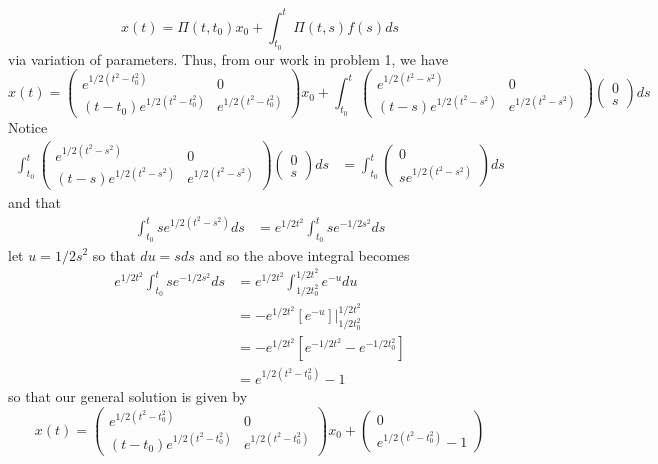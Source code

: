 \documentclass{article}
\begin{document}
\begin{itemize}
\[x(t) = \Pi(t,t_0)x_0 + \int_{t_0}^t\Pi(t,s)f(s)ds\]
via variation of parameters. Thus, from our work in problem 1, we have
\[x(t) = 
\begin{pmatrix}
    e^{1/2(t^2 - t_0^2)} & 0\\
    (t - t_0)e^{1/2(t^2 - t_0^2)} & e^{1/2(t^2 - t_0^2)}
\end{pmatrix}x_0 + \int_{t_0}^t \begin{pmatrix}
        e^{1/2(t^2 - s^2)} & 0\\
        (t - s)e^{1/2(t^2 - s^2)} & e^{1/2(t^2 - s^2)}
\end{pmatrix}\begin{pmatrix}
    0\\
    s
\end{pmatrix}ds\]
Notice
\begin{align*}
    \int_{t_0}^t \begin{pmatrix}
        e^{1/2(t^2 - s^2)} & 0\\
        (t - s)e^{1/2(t^2 - s^2)} & e^{1/2(t^2 - s^2)}
    \end{pmatrix}\begin{pmatrix}
        0\\
        s
    \end{pmatrix}ds &= \int_{t_0}^t \begin{pmatrix}
        0\\
        se^{1/2(t^2 - s^2)}
    \end{pmatrix}ds
\end{align*}
and that
\begin{align*}
    \int_{t_0}^t se^{1/2(t^2-s^2)}ds &= e^{1/2t^2} \int_{t_0}^t se^{-1/2s^2}ds
\end{align*}
let $u = 1/2s^2$ so that $du = sds$ and so the above integral becomes
\begin{align*}
    e^{1/2t^2} \int_{t_0}^t se^{-1/2s^2}ds &= e^{1/2t^2}\int_{1/2t_0^2}^{1/2t^2}e^{-u}du\\
    &= -e^{1/2t^2}\left[e^{-u}\right]\bigg|_{1/2t_0^2}^{1/2t^2}\\
    &=-e^{1/2t^2}\left[e^{-1/2t^2} - e^{-1/2t_0^2}\right]\\
    &= e^{1/2(t^2 - t_0^2)} - 1
\end{align*}
so that our general solution is given by
\[x(t) = \begin{pmatrix}
        e^{1/2(t^2 - t_0^2)} & 0\\
        (t - t_0)e^{1/2(t^2 - t_0^2)} & e^{1/2(t^2 - t_0^2)}
\end{pmatrix}x_0 + \begin{pmatrix}
    0\\
    e^{1/2(t^2 - t_0^2)} - 1
\end{pmatrix}\]

\end{itemize}
\end{document}

